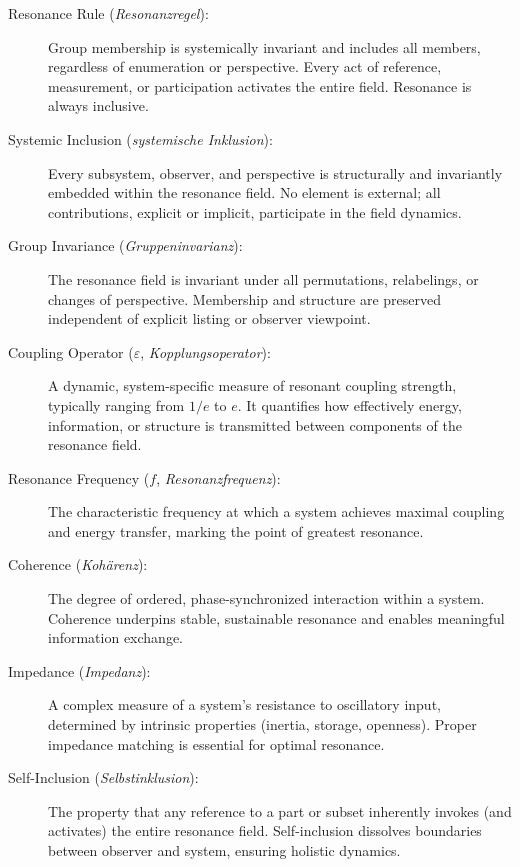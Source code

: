\documentclass[12pt]{iopart}
\begin{document}
\begin{description}
	\item[Resonance Rule (\textit{Resonanzregel}):]  
	Group membership is systemically invariant and includes all members, regardless of enumeration or perspective. Every act of reference, measurement, or participation activates the entire field. Resonance is always inclusive.
	
	\item[Systemic Inclusion (\textit{systemische Inklusion}):]  
	Every subsystem, observer, and perspective is structurally and invariantly embedded within the resonance field. No element is external; all contributions, explicit or implicit, participate in the field dynamics.
	
	\item[Group Invariance (\textit{Gruppeninvarianz}):]  
	The resonance field is invariant under all permutations, relabelings, or changes of perspective. Membership and structure are preserved independent of explicit listing or observer viewpoint.
	
	\item[Coupling Operator ($\varepsilon$, \textit{Kopplungsoperator}):]  
	A dynamic, system-specific measure of resonant coupling strength, typically ranging from $1/e$ to $e$. It quantifies how effectively energy, information, or structure is transmitted between components of the resonance field.
	
	\item[Resonance Frequency ($f$, \textit{Resonanzfrequenz}):]  
	The characteristic frequency at which a system achieves maximal coupling and energy transfer, marking the point of greatest resonance.
	
	\item[Coherence (\textit{Kohärenz}):]  
	The degree of ordered, phase-synchronized interaction within a system. Coherence underpins stable, sustainable resonance and enables meaningful information exchange.
	
	\item[Impedance (\textit{Impedanz}):]  
	A complex measure of a system’s resistance to oscillatory input, determined by intrinsic properties (inertia, storage, openness). Proper impedance matching is essential for optimal resonance.
	
	\item[Self-Inclusion (\textit{Selbstinklusion}):]  
	The property that any reference to a part or subset inherently invokes (and activates) the entire resonance field. Self-inclusion dissolves boundaries between observer and system, ensuring holistic dynamics.
	

\end{description}
\end{document}
